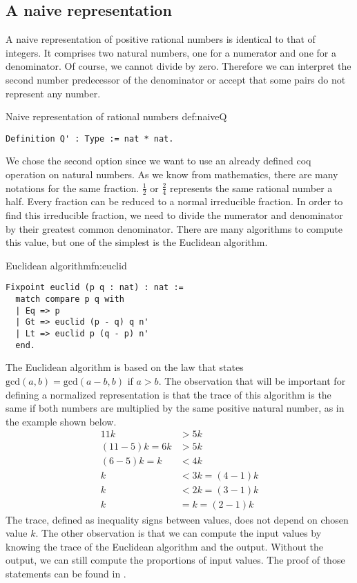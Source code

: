 \subsection{A naive representation}
A naive representation of positive rational numbers is identical to that of integers. It comprises two natural numbers, one for a numerator and one for a denominator. Of course, we cannot divide by zero. Therefore we can interpret the second number predecessor of the denominator or accept that some pairs do not represent any number.
\begin{defi}{Naive representation of rational numbers }{def:naiveQ}
\begin{verbatim}
Definition Q' : Type := nat * nat.
\end{verbatim}
\end{defi}
We chose the second option since we want to use an already defined coq operation on natural numbers. As we know from mathematics, there are many notations for the same fraction. $\frac{1}{2}$ or $\frac{2}{4}$ represents the same rational number a half. Every fraction can be reduced to a normal irreducible fraction. In order to find this irreducible fraction, we need to divide the numerator and denominator by their greatest common denominator. There are many algorithms to compute this value, but one of the simplest is the Euclidean algorithm.
\begin{func}{Euclidean algorithm}{fn:euclid}
\begin{verbatim}
Fixpoint euclid (p q : nat) : nat :=
  match compare p q with
  | Eq => p
  | Gt => euclid (p - q) q n'
  | Lt => euclid p (q - p) n'
  end.
\end{verbatim}
\end{func}
The Euclidean algorithm is based on the law that states $\textrm{gcd}(a, b) = \textrm{gcd}(a - b, b)$ if $a > b$. The observation that will be important for defining a normalized representation is that the trace of this algorithm is the same if both numbers are multiplied by the same positive natural number, as in the example shown below.
\begin{equation}
    \begin{split}
        11k&>5k\\
        (11-5)k=6k&>5k\\
        (6-5)k=k&<4k\\
        k&<3k=(4-1)k\\
        k&<2k=(3-1)k\\
        k&=k=(2-1)k
    \end{split}
\end{equation}
The trace,  defined as inequality signs between values, does not depend on chosen value $k$. The other observation is that we can compute the input values by knowing the trace of the Euclidean algorithm and the output. Without the output, we can still compute the proportions of input values. The proof of those statements can be found in .

